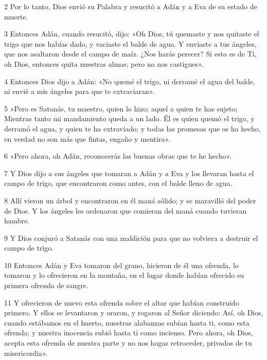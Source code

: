 \par 2 Por lo tanto, Dios envió su Palabra y resucitó a Adán y a Eva de su estado de muerte.

\par 3 Entonces Adán, cuando resucitó, dijo: «Oh Dios, tú quemaste y nos quitaste el trigo que nos habías dado, y vaciaste el balde de agua. Y enviaste a tus ángeles, que nos asaltaron desde el campo de maíz. ¿Nos harás perecer? Si esto es de Ti, oh Dios, entonces quita nuestras almas; pero no nos castigues».

\par 4 Entonces Dios dijo a Adán: «No quemé el trigo, ni derramé el agua del balde, ni envié a mis ángeles para que te extraviaran».

\par 5 »Pero es Satanás, tu maestro, quien lo hizo; aquel a quien te has sujeto; Mientras tanto mi mandamiento queda a un lado. Él es quien quemó el trigo, y derramó el agua, y quien te ha extraviado; y todas las promesas que os ha hecho, en verdad no son más que fintas, engaño y mentira».

\par 6 «Pero ahora, oh Adán, reconocerás las buenas obras que te he hecho».

\par 7 Y Dios dijo a sus ángeles que tomaran a Adán y a Eva y los llevaran hasta el campo de trigo, que encontraron como antes, con el balde lleno de agua.

\par 8 Allí vieron un árbol y encontraron en él maná sólido; y se maravilló del poder de Dios. Y los ángeles les ordenaron que comieran del maná cuando tuvieran hambre.

\par 9 Y Dios conjuró a Satanás con una maldición para que no volviera a destruir el campo de trigo.

\par 10 Entonces Adán y Eva tomaron del grano, hicieron de él una ofrenda, lo tomaron y lo ofrecieron en la montaña, en el lugar donde habían ofrecido su primera ofrenda de sangre.

\par 11 Y ofrecieron de nuevo esta ofrenda sobre el altar que habían construido primero. Y ellos se levantaron y oraron, y rogaron al Señor diciendo: Así, oh Dios, cuando estábamos en el huerto, nuestras alabanzas subían hasta ti, como esta ofrenda; y nuestra inocencia subió hasta ti como incienso. Pero ahora, oh Dios, acepta esta ofrenda de nuestra parte y no nos hagas retroceder, privados de tu misericordia».

